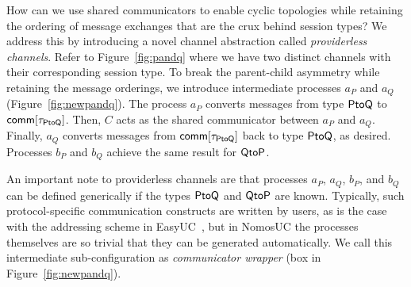 How can we use shared communicators to enable cyclic topologies while retaining the ordering
of message exchanges that are the crux behind session types?
We address this by introducing a novel channel abstraction called \emph{providerless channels}.
Refer to Figure~\ref{fig:pandq} where we have two distinct channels with their corresponding
session type.
To break the parent-child asymmetry while retaining  the message orderings, we introduce
intermediate processes $a_P$ and $a_Q$ (Figure~\ref{fig:newpandq}). The process $a_P$ converts
messages from type $\mathsf{PtoQ}$ to $\mathsf{comm[\tau_{PtoQ}]}$.
Then, $C$ acts as the shared communicator between $a_P$ and $a_Q$.
Finally, $a_Q$ converts messages from $\mathsf{comm[\tau_{PtoQ}]}$ back to type $\mathsf{PtoQ}$, as desired.
Processes $b_P$ and $b_Q$ achieve the same result for $\mathsf{QtoP}$.

An important note to providerless channels are that processes $a_P$, $a_Q$, $b_P$, and $b_Q$ can be defined
generically if the types $\mathsf{PtoQ}$ and $\mathsf{QtoP}$ are known.
Typically, such protocol-specific communication constructs are written by users, as is the case with the addressing scheme in EasyUC~\cite{easyuc},
but in NomosUC the processes themselves are so trivial that they can be generated automatically.
We call this intermediate sub-configuration as \emph{communicator wrapper} (box in Figure~\ref{fig:newpandq}).

